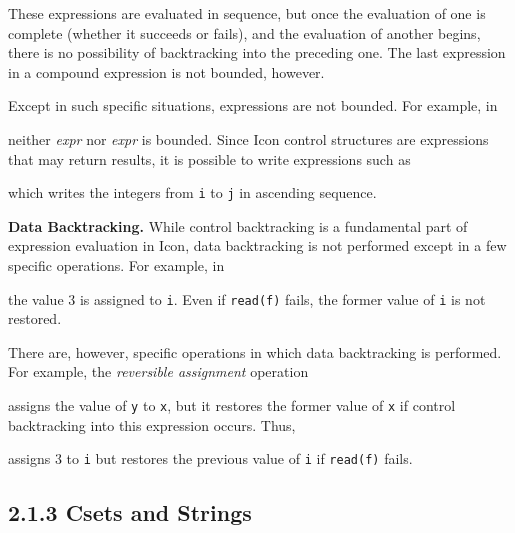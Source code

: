 
These expressions are evaluated in sequence, but once the evaluation
of one is complete (whether it succeeds or fails), and the evaluation
of another begins, there is no possibility of backtracking into the
preceding one. The last expression in a compound expression is not
bounded, however.

Except in such specific situations, expressions are not bounded. For
example, in


\noindent neither \textit{expr}\textit{} nor
\textit{expr}\textit{} is bounded. Since Icon control
structures are expressions that may return results, it is possible to
write expressions such as


\noindent
which writes the integers from \texttt{i} to \texttt{j} in ascending sequence.


\textbf{Data Backtracking.} While control backtracking is a
fundamental part of expression evaluation in Icon, data backtracking
is not performed except in a few specific operations. For example, in


\noindent the value 3 is assigned to \texttt{i}. Even if
\texttt{read(f)} fails, the former value of \texttt{i} is not
restored.

There are, however, specific operations in which data backtracking is
performed. For example, the \textit{reversible assignment} operation


\noindent assigns the value of \texttt{y} to \texttt{x}, but it
restores the former value of \texttt{x} if control backtracking into
this expression occurs.  Thus,


\noindent
assigns 3 to \texttt{i} but restores the previous value of \texttt{i}
if \texttt{read(f)} fails.


\subsection[2.1.3 Csets and Strings]{2.1.3 Csets and Strings}


